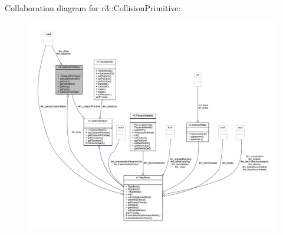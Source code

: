 Collaboration diagram for r3\+:\+:Collision\+Primitive\+:\nopagebreak
\begin{figure}[H]
\begin{center}
\leavevmode
\includegraphics[width=350pt]{classr3_1_1_collision_primitive__coll__graph}
\end{center}
\end{figure}

